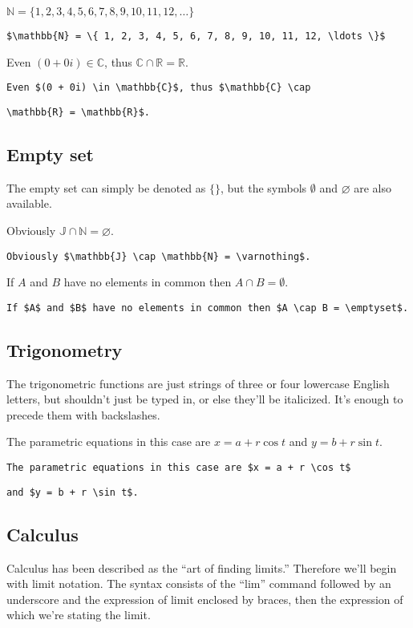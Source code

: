 $\mathbb{N} = \{ 1, 2, 3, 4, 5, 6, 7, 8, 9, 10, 11, 12, \ldots \}$

\verb'$\mathbb{N} = \{ 1, 2, 3, 4, 5, 6, 7, 8, 9, 10, 11, 12, \ldots \}$'

Even $(0 + 0i) \in \mathbb{C}$, thus $\mathbb{C} \cap \mathbb{R} = \mathbb{R}$.

\verb'Even $(0 + 0i) \in \mathbb{C}$, thus $\mathbb{C} \cap'

\verb'\mathbb{R} = \mathbb{R}$.'

\subsection{Empty set}

The empty set can simply be denoted as $\{ \}$, but the symbols $\emptyset$ and $\varnothing$ are also available.

Obviously $\mathbb{J} \cap \mathbb{N} = \varnothing$.

\verb'Obviously $\mathbb{J} \cap \mathbb{N} = \varnothing$.'

If $A$ and $B$ have no elements in common then $A \cap B = \emptyset$.

\verb'If $A$ and $B$ have no elements in common then $A \cap B = \emptyset$.'

\subsection*{Trigonometry}

The trigonometric functions are just strings of three or four lowercase English letters, but shouldn't just be typed in, or else they'll be italicized. It's enough to precede them with backslashes.

The parametric equations in this case are $x = a + r \cos t$ and $y = b + r \sin t$.

\verb'The parametric equations in this case are $x = a + r \cos t$'

\verb'and $y = b + r \sin t$.'

\subsection*{Calculus}

Calculus has been described as the ``art of finding limits.'' Therefore we'll begin with limit notation. The syntax consists of the ``lim'' command followed by an underscore and the expression of limit enclosed by braces, then the expression of which we're stating the limit.


